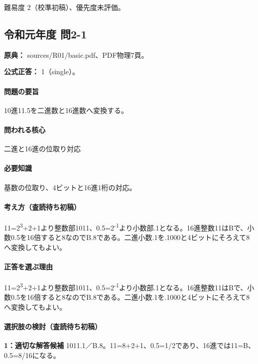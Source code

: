 \par 難易度 2（校準初稿）、優先度未評価。

\subsection{令和元年度 問2-1}
\label{q:r01-reg-basic-2-1}

\noindent\textbf{原典：} sources/R01/basic.pdf、PDF物理7頁。

\textbf{公式正答：} 1（single）。

\paragraph{問題の要旨} 10進11.5を二進数と16進数へ変換する。

\paragraph{問われる核心} 二進と16進の位取り対応

\paragraph{必要知識} 基数の位取り、4ビットと16進1桁の対応。

\paragraph{考え方（査読待ち初稿）} 11=2\textsuperscript{3}+2+1より整数部1011、0.5=2\textsuperscript{-1}より小数部.1となる。16進整数11はBで、小数0.5を16倍すると8なのでB.8である。二進小数.1を.1000と4ビットにそろえて8へ変換してもよい。

\paragraph{正答を選ぶ理由} 11=2\textsuperscript{3}+2+1より整数部1011、0.5=2\textsuperscript{-1}より小数部.1となる。16進整数11はBで、小数0.5を16倍すると8なのでB.8である。二進小数.1を.1000と4ビットにそろえて8へ変換してもよい。

\paragraph{選択肢の検討（査読待ち初稿）}

\noindent\textbf{1：適切な解答候補} 1011.1／B.8。11=8+2+1、0.5=1/2であり、16進では11=B、0.5=8/16になる。\par

